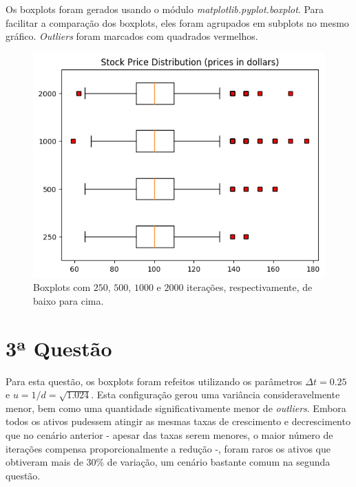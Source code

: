 \documentclass{article}
\begin{document}
Os boxplots foram gerados usando o módulo \emph{matplotlib.pyplot.boxplot}.
Para facilitar a comparação dos boxplots, eles foram agrupados em subplots no mesmo gráfico.
\emph{Outliers} foram marcados com quadrados vermelhos.

\begin{figure}[H]
	\includegraphics[width=\linewidth]{fig1_250.png}
	\centering
	
	\caption{Boxplots com $250$, $500$, $1000$ e $2000$ iterações, respectivamente, de baixo para cima.}
	\label{}
\end{figure}


\section*{3ª Questão}

Para esta questão, os boxplots foram refeitos utilizando os parâmetros $\Delta t = 0.25$ e $u = 1/d = \sqrt{1.024}$.
Esta configuração gerou uma variância consideravelmente menor, bem como uma quantidade significativamente menor de \emph{outliers}.
Embora todos os ativos pudessem atingir as mesmas taxas de crescimento e decrescimento que no cenário anterior - apesar das taxas serem menores, o maior número de iterações compensa proporcionalmente a redução -, foram raros os ativos que obtiveram mais de 30\% de variação, um cenário bastante comum na segunda questão.
\end{document}
